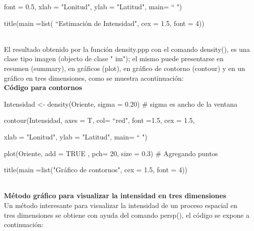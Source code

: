 \documentclass[12pt]{report}
\begin{document}
{{{{{{{  		font = 0.5, xlab = "Lonitud",  ylab = "Latitud", main= “  ")  \vspace{-0.15cm}
  		
  		title(main =list( “Estimación de Intensidad", cex = 1.5, font = 4)) 	}}\\
  


	
		El resultado obtenido por la función density.ppp con el comando density(), es una clase tipo imagen (objecto de clase     "\! im"); el mismo puede presentarse en resumen (summary),  en  gráficos (plot), en gráfico de contorno (contour) y en un gráfico en tres dimensiones,  como se muestra acontinuación:  \\
		
		
		    
		
		
		
			
	
	
	   	
	   \textbf{Código para contornos}\\
	   
	   { \scriptsize  { \ttfamily 
	   		
	   		Intensidad <- density(Oriente, sigma = 0.20)  \#  sigma es ancho de la ventana
	   		
	   		contour(Intensidad, axes = T,  col=  “red", font =1.5, cex = 1.5,
	   		
	   		xlab = "Lonitud", ylab = "Latitud", main= “  ")  
	   		
	   		plot(Oriente, add = TRUE , pch= 20, size = 0.3)  \# Agregando puntos \vspace{-0.15cm}
	   		
	   		title(main =list("Gráfico de contornos", cex = 1.5,  font = 4))  }}\\
	   
	   
	
	\textbf{Método gráfico para visualizar la intensidad en tres dimensiones}{\label{Pesrs}\\
		
		Un método interesante para visualizar la intensidad de un proceso espacial en tres dimensiones se obtiene con ayuda del comando { \ttfamily persp()}, el código se expone a continuación:\\
		
}}}}}}
\end{document}
